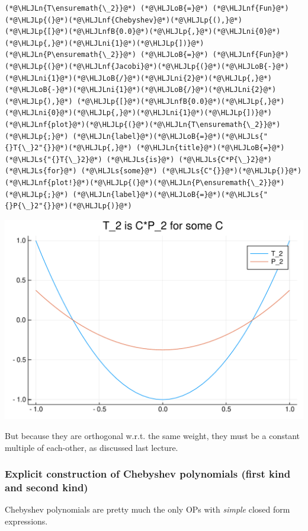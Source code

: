 \documentclass[12pt,a4paper]{article}
\newcommand{\HLJLn}[1]{#1}
\newcommand{\HLJLnf}[1]{\textcolor[RGB]{66,102,213}{#1}}
\newcommand{\HLJLs}[1]{\textcolor[RGB]{201,61,57}{#1}}
\newcommand{\HLJLnfB}[1]{\textcolor[RGB]{59,151,46}{#1}}
\newcommand{\HLJLni}[1]{\textcolor[RGB]{59,151,46}{#1}}
\newcommand{\HLJLoB}[1]{\textcolor[RGB]{102,102,102}{\textbf{#1}}}
\newcommand{\HLJLp}[1]{#1}
\begin{document}
\begin{lstlisting}
(*@\HLJLn{T\ensuremath{\_2}}@*) (*@\HLJLoB{=}@*) (*@\HLJLnf{Fun}@*)(*@\HLJLp{(}@*)(*@\HLJLnf{Chebyshev}@*)(*@\HLJLp{(),}@*) (*@\HLJLp{[}@*)(*@\HLJLnfB{0.0}@*)(*@\HLJLp{,}@*)(*@\HLJLni{0}@*)(*@\HLJLp{,}@*)(*@\HLJLni{1}@*)(*@\HLJLp{])}@*)
(*@\HLJLn{P\ensuremath{\_2}}@*) (*@\HLJLoB{=}@*) (*@\HLJLnf{Fun}@*)(*@\HLJLp{(}@*)(*@\HLJLnf{Jacobi}@*)(*@\HLJLp{(}@*)(*@\HLJLoB{-}@*)(*@\HLJLni{1}@*)(*@\HLJLoB{/}@*)(*@\HLJLni{2}@*)(*@\HLJLp{,}@*)(*@\HLJLoB{-}@*)(*@\HLJLni{1}@*)(*@\HLJLoB{/}@*)(*@\HLJLni{2}@*)(*@\HLJLp{),}@*) (*@\HLJLp{[}@*)(*@\HLJLnfB{0.0}@*)(*@\HLJLp{,}@*)(*@\HLJLni{0}@*)(*@\HLJLp{,}@*)(*@\HLJLni{1}@*)(*@\HLJLp{])}@*)
(*@\HLJLnf{plot}@*)(*@\HLJLp{(}@*)(*@\HLJLn{T\ensuremath{\_2}}@*)(*@\HLJLp{;}@*) (*@\HLJLn{label}@*)(*@\HLJLoB{=}@*)(*@\HLJLs{"{}T{\_}2"{}}@*)(*@\HLJLp{,}@*) (*@\HLJLn{title}@*)(*@\HLJLoB{=}@*)(*@\HLJLs{"{}T{\_}2}@*) (*@\HLJLs{is}@*) (*@\HLJLs{C*P{\_}2}@*) (*@\HLJLs{for}@*) (*@\HLJLs{some}@*) (*@\HLJLs{C"{}}@*)(*@\HLJLp{)}@*)
(*@\HLJLnf{plot!}@*)(*@\HLJLp{(}@*)(*@\HLJLn{P\ensuremath{\_2}}@*)(*@\HLJLp{;}@*) (*@\HLJLn{label}@*)(*@\HLJLoB{=}@*)(*@\HLJLs{"{}P{\_}2"{}}@*)(*@\HLJLp{)}@*)
\end{lstlisting}

\includegraphics[width=\linewidth]{figures/Lecture21_4_1.pdf}

But because they are orthogonal w.r.t. the same weight, they must be a constant multiple of each-other, as discussed last lecture.

\subsubsection{Explicit construction of Chebyshev polynomials (first kind and second kind)}
Chebyshev polynomials are pretty much the only OPs with \emph{simple} closed form expressions.
\end{document}
